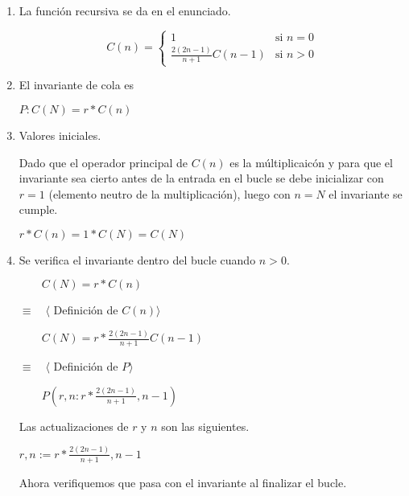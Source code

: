 \documentclass[hidelinks]{article}
\begin{document}
\begin{enumerate}
	\item La función recursiva se da en el enunciado.\par
	      \begin{equation}
		      C(n) =
		      \begin{cases}
			      1                               & \text{si } n = 0 \\
			      \frac{2(2n - 1)}{n + 1}C(n - 1) & \text{si } n > 0
		      \end{cases}
	      \end{equation} \par
	\item El invariante de cola es
	      \begin{center}
		      $P: C(N) = r * C(n)$\par
	      \end{center}
	\item Valores iniciales.\par
	      Dado que el operador principal de $C(n)$ es la múltiplicaicón y para que el
	      invariante sea cierto antes de la entrada en el bucle se debe inicializar con
	      $r = 1$ (elemento neutro de la multiplicación), luego con $n = N$ el invariante
	      se cumple.\par
	      $r * C(n) = 1 * C(N) = C(N)$\par
	\item Se verifica el invariante dentro del bucle cuando $n > 0$.\par
	      $\qquad C(N) = r * C(n)$\par
	      $\equiv \quad \langle$ Definición de  $C(n)\rangle$\par
	      $\qquad C(N) = r * \frac{2(2n - 1)}{n + 1}C(n - 1)$\par
	      $\equiv \quad \langle$ Definición de  $P\rangle$\par
	      $\qquad P(r,n : r * \frac{2(2n - 1)}{n + 1}, n - 1)$\par

	      Las actualizaciones de $r$ y $n$ son las siguientes.\par

	      \begin{center}
		      $r, n := r * \frac{2(2n - 1)}{n + 1}, n - 1$
	      \end{center}

	      Ahora verifiquemos que pasa con el invariante al finalizar el bucle.\par


\end{enumerate}
\end{document}
